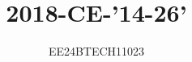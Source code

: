 \documentclass[journal,12pt,onecolumn]{IEEEtran}
\theoremstyle{remark}
\begin{document}

\vspace{3cm}


\title{2018-CE-'14-26'}
\author{EE24BTECH11023}

{\let\newpage\relax\maketitle}

\renewcommand{\thefigure}{\theenumi}
\renewcommand{\thetable}{\theenumi}
\setlength{\intextsep}{10pt} %


\renewcommand{\thetable}{\theenumi}
\end{document}
